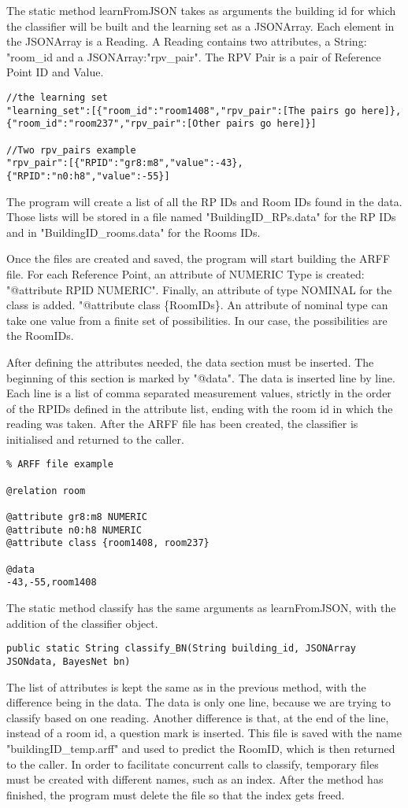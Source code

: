 \noindent
The static method learnFromJSON takes as arguments the building id for which the classifier will be built and the learning set as a JSONArray. Each element in the JSONArray is a Reading. A Reading contains two attributes, a String: "room\_id and a JSONArray:"rpv\_pair". The RPV Pair is a pair of Reference Point ID and Value. 
\begin{lstlisting}
//the learning set
"learning_set":[{"room_id":"room1408","rpv_pair":[The pairs go here]},{"room_id":"room237","rpv_pair":[Other pairs go here]}]

//Two rpv_pairs example
"rpv_pair":[{"RPID":"gr8:m8","value":-43},{"RPID":"n0:h8","value":-55}]
\end{lstlisting}

\noindent
The program will create a list of all the RP IDs and Room IDs found in the data. Those lists will be stored in a file named "BuildingID\_RPs.data" for the RP IDs and in "BuildingID\_rooms.data" for the Rooms IDs. 

\noindent
Once the files are created and saved, the program will start building the ARFF file. For each Reference Point, an attribute of NUMERIC Type is created: "@attribute RPID NUMERIC". Finally, an attribute of type NOMINAL for the class is added. "@attribute class \{RoomIDs\}. An attribute of nominal type can take one value from a finite set of possibilities. In our case, the possibilities are the RoomIDs. 

\noindent
After defining the attributes needed, the data section must be inserted. The beginning of this section is marked by "@data". The data is inserted line by line. Each line is a list of comma separated measurement values, strictly in the order of the RPIDs defined in the attribute list, ending with the room id in which the reading was taken. After the ARFF file has been created, the classifier is initialised and returned to the caller.
\begin{lstlisting}
% ARFF file example

@relation room

@attribute gr8:m8 NUMERIC
@attribute n0:h8 NUMERIC
@attribute class {room1408, room237}

@data 
-43,-55,room1408
\end{lstlisting}

\noindent
The static method classify has the same arguments as learnFromJSON, with the addition of the classifier object. 
\begin{lstlisting} 
public static String classify_BN(String building_id, JSONArray JSONdata, BayesNet bn)
\end{lstlisting}
The list of attributes is kept the same as in the previous method, with the difference being in the data. The data is only one line, because we are trying to classify based on one reading. Another difference is that, at the end of the line, instead of a room id, a question mark is inserted. This file is saved with the name "buildingID\_temp.arff" and used to predict the RoomID, which is then returned to the caller. In order to facilitate concurrent calls to classify, temporary files must be created with different names, such as an index. After the method has finished, the program must delete the file so that the index gets freed.

